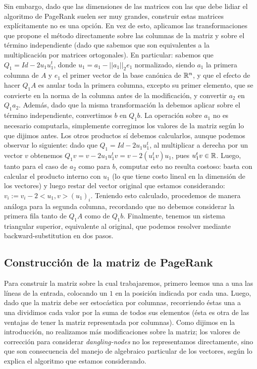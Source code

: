 Sin embargo, dado que las dimensiones de las matrices con las que debe lidiar el algoritmo de PageRank suelen ser muy grandes, construir estas matrices explícitamente no es una opción. En vez de esto, aplicamos las transformaciones que propone el método directamente sobre las columnas de la matriz y sobre el término independiente (dado que sabemos que son equivalentes a la multiplicación por matrices ortogonales). En particular: sabemos que $Q_1 = Id - 2 u_1u_1^t$, donde $u_1 = a_1 - ||a_1||_2 e_1$ normalizado, siendo $a_1$ la primera columna de $A$ y $e_1$ el primer vector de la base canónica de $\mathbb{R}^n$, y que el efecto de hacer $Q_1 A$ es anular toda la primera columna, excepto su primer elemento, que se convierte en la norma de la columna antes de la modificación, y convertir $a_2$ en $Q_1 a_2$. Además, dado que la misma transformación la debemos aplicar sobre el término independiente, convertimos $b$ en $Q_1 b$. La operación sobre $a_1$ no es necesario computarla, simplemente corregimos los valores de la matriz según lo que dijimos antes. Los otros productos sí debemos calcularlos, aunque podemos observar lo siguiente: dado que $Q_1 = Id -2u_1u_1^t$, al multiplicar a derecha por un vector $v$ obtenemos $Q_1 v = v - 2 u_1 u_1^t v =v - 2(u_1^t v)u_1$, pues $u_1^t v\in \mathbb{R}$. Luego, tanto para el caso de $a_2$ como para $b$, computar esto no resulta costoso: basta con calcular el producto interno con $u_1$ (lo que tiene costo lineal en la dimensión de los vectores) y luego restar del vector original que estamos considerando: $v_i := v_i - 2 <u_1, v> (u_1)_i$. Teniendo esto calculado, procedemos de manera análoga para la segunda columna, recordando que no debemos considerar la primera fila tanto de $Q_1 A$ como de $Q_1 b$. Finalmente, tenemos un sistema triangular superior, equivalente al original, que podemos resolver mediante backward-substitution en dos pasos. 
 
\subsection{Construcción de la matriz de PageRank}
Para construir la matriz sobre la cual trabajaremos, primero leemos una a una las líneas de la entrada, colocando un $1$ en la posición indicada por cada una. Luego, dado que la matriz debe ser estocástica por columnas, recorriendo éstas una a una dividimos cada valor por la suma de todos sus elementos (ésta es otra de las ventajas de tener la matriz representada por columnas). Como dijimos en la introducción, no realizamos más modificaciones sobre la matriz; los valores de corrección para considerar \emph{dangling-nodes} no los representamos directamente, sino que son consecuencia del manejo de algebraico particular de los vectores, según lo explica el algoritmo que estamos considerando.